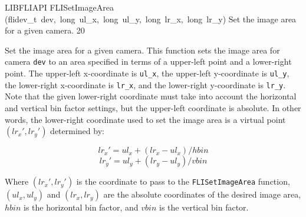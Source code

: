 \documentclass{article}
\begin{document}
\begin{cxxfunction}
{LIBFLIAPI}
        {FLISetImageArea}
        {(flidev\_t\ dev,\ long\ ul\_x,\ long\ ul\_y,\ long\ lr\_x,\ long\ lr\_y)}
        {
 Set the image area for a given camera.}
        {20}
\begin{cxxdoc}

Set the image area for a given camera.  This function sets the
image area for camera \texttt{dev} to an area specified in terms of
a upper-left point and a lower-right point.  The upper-left
x-coordinate is \texttt{ul\_x}, the upper-left y-coordinate is
\texttt{ul\_y}, the lower-right x-coordinate is \texttt{lr\_x}, and
the lower-right y-coordinate is \texttt{lr\_y}.  Note that the given
lower-right coordinate must take into account the horizontal and
vertical bin factor settings, but the upper-left coordinate is
absolute.  In other words, the lower-right coordinate used to set
the image area is a virtual point $(lr_x', lr_y')$ determined by:

\[ lr_x' = ul_x + (lr_x - ul_x) / hbin \]
\[ lr_y' = ul_y + (lr_y - ul_y) / vbin \]

Where $(lr_x', lr_y')$ is the coordinate to pass to the
\texttt{FLISetImageArea} function, $(ul_x, ul_y)$ and $(lr_x,
lr_y)$ are the absolute coordinates of the desired image area,
$hbin$ is the horizontal bin factor, and $vbin$ is the vertical bin
factor.


\end{cxxdoc}
\end{cxxfunction}
\end{document}
